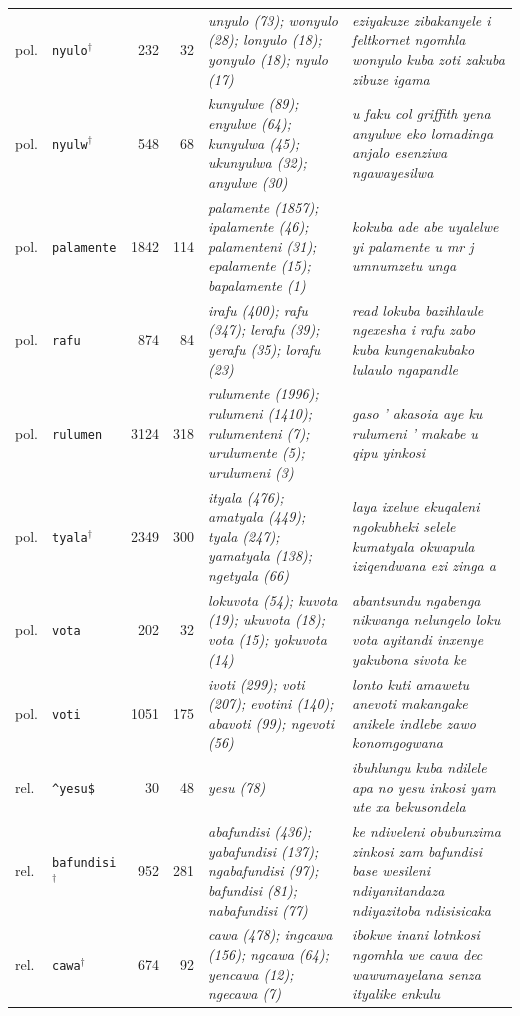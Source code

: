 \begin{table}[h]
\begin{tabular}{@{}llrrp{}p{}@{}}
pol. & \texttt{nyulo}$^\dagger$ & 232 & 32 & \emph{unyulo (73); wonyulo (28); lonyulo (18); yonyulo (18); nyulo (17)} & \emph{eziyakuze zibakanyele i feltkornet ngomhla wonyulo kuba zoti zakuba zibuze igama} \\
pol. & \texttt{nyulw}$^\dagger$ & 548 & 68 & \emph{kunyulwe (89); enyulwe (64); kunyulwa (45); ukunyulwa (32); anyulwe (30)} & \emph{u faku col griffith yena anyulwe eko lomadinga anjalo esenziwa ngawayesilwa} \\
pol. & \texttt{palamente} & 1842 & 114 & \emph{palamente (1857); ipalamente (46); palamenteni (31); epalamente (15); bapalamente (1)} & \emph{kokuba ade abe uyalelwe yi palamente u mr j umnumzetu unga} \\
pol. & \texttt{rafu} & 874 & 84 & \emph{irafu (400); rafu (347); lerafu (39); yerafu (35); lorafu (23)} & \emph{read lokuba bazihlaule ngexesha i rafu zabo kuba kungenakubako lulaulo ngapandle} \\
pol. & \texttt{rulumen} & 3124 & 318 & \emph{rulumente (1996); rulumeni (1410); rulumenteni (7); urulumente (5); urulumeni (3)} & \emph{gaso ' akasoia aye ku rulumeni ' makabe u qipu yinkosi} \\
pol. & \texttt{tyala}$^\dagger$ & 2349 & 300 & \emph{ityala (476); amatyala (449); tyala (247); yamatyala (138); ngetyala (66)} & \emph{laya ixelwe ekuqaleni ngokubheki selele kumatyala okwapula iziqendwana ezi zinga a} \\
pol. & \texttt{vota} & 202 & 32 & \emph{lokuvota (54); kuvota (19); ukuvota (18); vota (15); yokuvota (14)} & \emph{abantsundu ngabenga nikwanga nelungelo loku vota ayitandi inxenye yakubona sivota ke} \\
pol. & \texttt{voti} & 1051 & 175 & \emph{ivoti (299); voti (207); evotini (140); abavoti (99); ngevoti (56)} & \emph{lonto kuti amawetu anevoti makangake anikele indlebe zawo konomgogwana} \\
rel. & \texttt{\^{}yesu\$} & 30 & 48 & \emph{yesu (78)} & \emph{ibuhlungu kuba ndilele apa no yesu inkosi yam ute xa bekusondela} \\
rel. & \texttt{bafundisi}$^\dagger$ & 952 & 281 & \emph{abafundisi (436); yabafundisi (137); ngabafundisi (97); bafundisi (81); nabafundisi (77)} & \emph{ke ndiveleni obubunzima zinkosi zam bafundisi base wesileni ndiyanitandaza ndiyazitoba ndisisicaka} \\
rel. & \texttt{cawa}$^\dagger$ & 674 & 92 & \emph{cawa (478); ingcawa (156); ngcawa (64); yencawa (12); ngecawa (7)} & \emph{ibokwe inani lotnkosi ngomhla we cawa dec wawumayelana senza ityalike enkulu} \\

\end{tabular}
\end{table}
